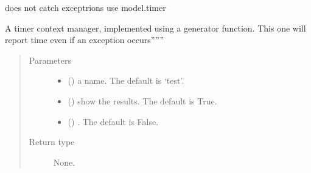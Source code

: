 \documentclass[letterpaper,10pt,english]{sphinxmanual}
\begin{document}

\begin{fulllineitems}
\label{\detokenize{core/modelclass:modelclass.timer_old}}
\pysigstartsignatures
{}
\pysigstopsignatures
\sphinxAtStartPar
does not catch exceptrions use model.timer

\sphinxAtStartPar
A timer context manager, implemented using a
generator function. This one will report time even if an exception occurs”””
\begin{quote}\begin{description}
\item[{Parameters}] \leavevmode\begin{itemize}
\item {} 
\sphinxAtStartPar
{} (\sphinxstyleliteralemphasis{\sphinxupquote{, }}) \textendash{} a name. The default is ‘test’.

\item {} 
\sphinxAtStartPar
{} (\sphinxstyleliteralemphasis{\sphinxupquote{, }}) \textendash{} show the results. The default is True.

\item {} 
\sphinxAtStartPar
{} (\sphinxstyleliteralemphasis{\sphinxupquote{, }}) \textendash{} . The default is False.

\end{itemize}

\item[{Return type}] \leavevmode
\sphinxAtStartPar
None.

\end{description}\end{quote}

\end{fulllineitems}
\end{document}
